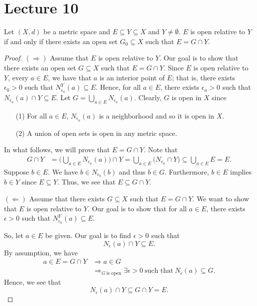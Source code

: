 \documentclass[a4paper]{report}
\begin{document}
\section{Lecture 10}

\begin{theorem}
Let \( (X,d) \) be a metric space and \( E \subseteq Y \subseteq X  \) and \( Y \neq \emptyset \). \( E  \) is open relative to \( Y  \) if and only if there exists an open set \( {G}_{0} \subseteq X   \) such that \( E = G \cap Y  \).
\end{theorem}
\begin{proof}
\( (\Longrightarrow) \) Assume that \( E  \) is open relative to \( Y  \). Our goal is to show that there exists an open set \( G \subseteq X  \) such that \( E = G \cap Y  \). Since \( E  \) is open relative to \( Y  \), every \( a \in E  \), we have that \( a  \) is an interior point of \( E  \); that is, there exists \( {\epsilon}_{0} > 0  \) such that \( {N}_{{\epsilon}_{a}}^{Y}(a) \subseteq E  \). Hence, for all \( a \in E  \), there exists \( {\epsilon}_{a} > 0  \) such that \( {N}_{{\epsilon}_{a}}(a) \cap Y \subseteq  E  \). Let \( G = \bigcup_{ a \in E  }^{  }  {N}_{{\epsilon}_{a}}(a) \). Clearly, \( G  \) is open in \( X  \) since 
\begin{enumerate}
    \item[(1)] For all \( a \in E  \), \( {N}_{{\epsilon}_{a}}(a)  \) is a neighborhood and so it is open in \( X  \).
    \item[(2)] A union of open sets is open in any metric space.
\end{enumerate}
In what follows, we will prove that \( E  = G \cap Y  \). Note that 
\begin{align*}
    G \cap Y &= \Big( \bigcup_{ a \in E  }^{  }  {N}_{{\epsilon}_{a}} (a) \Big) \cap Y = \bigcup_{ a \in E  }^{   }  \Big(  {N}_{\epsilon_a}  \cap Y\Big) \subseteq  \bigcup_{ a \in E  }^{  } E = E.
\end{align*}
Suppose \( b \in E  \). We have \( b \in {N}_{{\epsilon}_{b}}(b)  \) and thus \( b \in G  \). Furthermore, \(  b \in E  \) implies \( b \in Y  \) since \( E \subseteq Y  \). Thus, we see that \( E \subseteq G \cap Y  \).

\( (\Longleftarrow) \) Assume that there exists \( G \subseteq  X  \) such that \( E = G \cap Y  \). We want to show that \( E  \) is open relative to \( Y  \). Our goal is to show that for all \( a \in E  \), there exists \( \epsilon > 0  \) such that \( {N}_{{\epsilon}_{a}}^{Y}(a) \subseteq E  \).

So, let \( a \in E  \) be given. Our goal is to find \( \epsilon > 0  \) such that 
\[  {N}_{\epsilon}(a) \cap Y \subseteq  E. \]
By assumption, we have 
\begin{align*}
    a \in E = G \cap Y &\Longrightarrow a \in G  \\
                       &\Longrightarrow_{G \ \text{is open}} \exists \epsilon > 0 \ \text{such that} \ {N}_{\epsilon}(a) \subseteq G. 
\end{align*}
Hence, we see that 
\[  {N}_{\epsilon}(a) \cap Y \subseteq  G \cap Y = E. \]
\end{proof}
\end{document}
